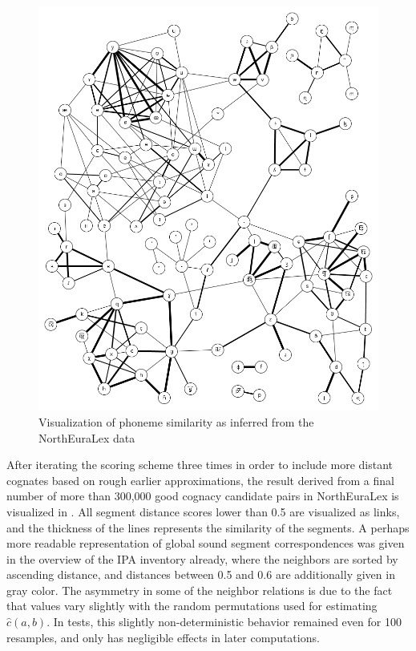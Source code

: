 \begin{figure}
\includegraphics[width=\textwidth]{figures/phoneme-neighbor-graph.png}
\caption{Visualization of phoneme similarity as inferred from the NorthEuraLex data}
\label{fig:phonemDistGlobal}
\end{figure}

After iterating the scoring scheme three times in order to include more distant cognates based on rough earlier approximations, the result derived from a final number of more than 300,000 good cognacy candidate pairs in NorthEuraLex is visualized in . All segment distance scores lower than 0.5 are visualized as links, and the thickness of the lines represents the similarity of the segments. A perhaps more readable representation of global sound segment correspondences was given in the overview of the IPA inventory already, where the neighbors are sorted by ascending distance, and distances between 0.5 and 0.6 are additionally given in gray color. The asymmetry in some of the neighbor relations is due to the fact that values vary slightly with the random permutations used for estimating $\hat{c}(a,b)$. In tests, this slightly non-deterministic behavior remained even for 100 resamples, and only has negligible effects in later computations.

